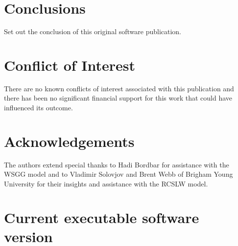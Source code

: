 \documentclass[preprint,12pt, a4paper]{elsarticle}
\begin{document}

\section{Conclusions} \label{s:conclusions}

Set out the conclusion of this original software publication.


\section{Conflict of Interest} \label{s:coi}

There are no known conflicts of interest associated with this publication and there has been no significant financial support for     this work that could have influenced its outcome.


\section*{Acknowledgements} \label{sec:acknowledgements}

The authors extend special thanks to Hadi Bordbar for assistance with the WSGG model and to Vladimir Solovjov and Brent Webb of Brigham Young University for their insights and assistance with the RCSLW model. 


 
 


\section*{Current executable software version} \label{s:current_software}

\end{document}
